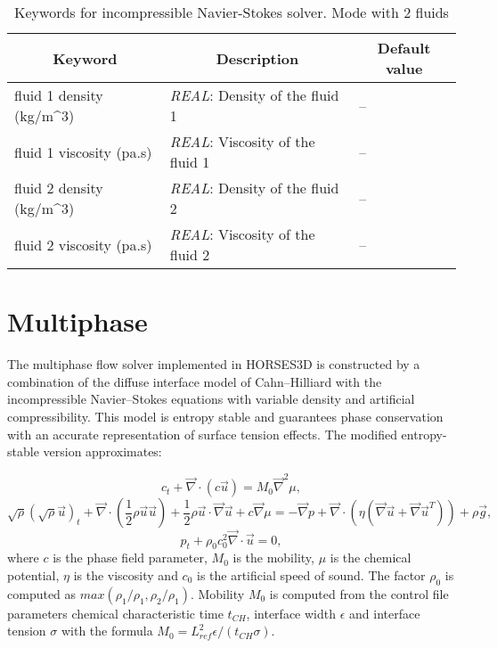 \documentclass[a4paper,10pt]{report}
\begin{document}
    \begin{table}[htbp]
        \caption{Keywords for incompressible Navier-Stokes solver. Mode with 2 fluids}
        \begin{tabular}{|l|p{10cm}|p{2.2cm}|}
        \hline
        \multicolumn{1}{|c|}{Keyword} & \multicolumn{1}{c|}{Description} & \multicolumn{1}{c|}{Default value} \\ \hline
        fluid 1 density (kg/m\^{}3)           & \textit{REAL}: Density of the fluid 1 & -- \\ \hline
        fluid 1 viscosity (pa.s)           & \textit{REAL}: Viscosity of the fluid 1 & -- \\ \hline     
        fluid 2 density (kg/m\^{}3)           & \textit{REAL}: Density of the fluid 2 & -- \\ \hline
        fluid 2 viscosity (pa.s)           & \textit{REAL}: Viscosity of the fluid 2  & -- \\ \hline                                                                          
    \end{tabular}
    \label{tab:INSKey_2fluid}
    \end{table}    


\section{Multiphase}

The multiphase flow solver implemented in {\selectfont  HORSES3D} is constructed by a combination of the diffuse interface model of Cahn–Hilliard
with the incompressible Navier–Stokes equations with variable density and artificial compressibility. 
This model is entropy stable and guarantees phase conservation with an accurate representation of surface tension effects. 
The modified entropy-stable version approximates:

\begin{equation}
c_t + \vec{\nabla}\cdot\left(c\vec{u}\right) = M_0 \vec{\nabla}^2 \mu,
\label{eq:governing:cahn--hilliard}
\end{equation}
%
\begin{equation}
\sqrt{\rho}\left(\sqrt{\rho}\vec{u}\right)_t+\vec{\nabla}\cdot\left(\frac{1}{2}\rho \vec{u}\vec{u}\right) 
+\frac{1}{2}\rho\vec{u}\cdot\vec{\nabla}\vec{u}+c\vec{\nabla}\mu
= -\vec{\nabla}p + \vec{\nabla}\cdot\left(\eta\left(\vec{\nabla}\vec{u} + 
\vec{\nabla}\vec{u}^{T}\right)\right)+\rho\vec{g},
\label{eq:governing:momentum-skewsymmetric-sqrtRho}
\end{equation}
%
\begin{equation}
  p_t + \rho_0 c_0^2 \vec{\nabla}\cdot\vec{u} = 0,
  \label{eq:governing:ACM}
\end{equation}
%
where $c$ is the phase field parameter, $M_0$ is the mobility, $\mu$ is the chemical potential, 
$\eta$ is the viscosity and $c_0$ is the artificial speed of sound. The factor $\rho_0$ is computed as $max(\rho_1/\rho_1,\rho_2/\rho_1)$.
Mobility $M_0$ is computed from the control file parameters chemical characteristic time $t_{CH}$, interface width $\epsilon$ and interface tension $\sigma$ with the formula 
$M_0 = L_{ref}^2 \epsilon /(t_{CH} \sigma)$. 
\end{document}
